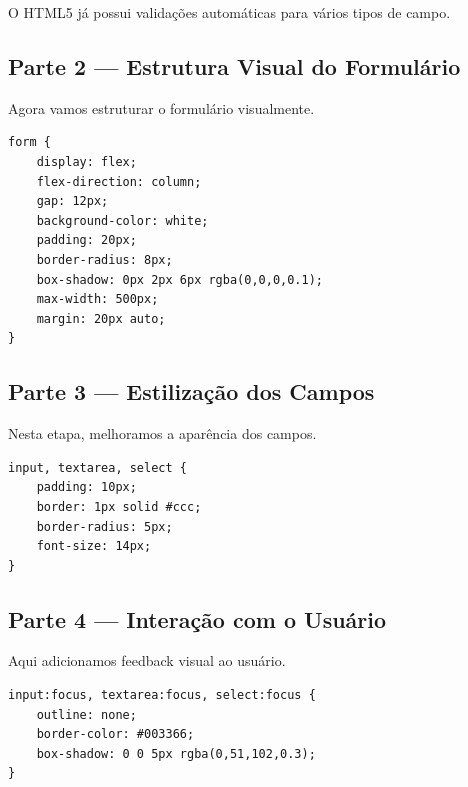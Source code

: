 \documentclass[12pt,a4paper]{article}
\begin{document}
\begin{boxDica}
O HTML5 já possui validações automáticas para vários tipos de campo.
\end{boxDica}


\subsection{Parte 2 — Estrutura Visual do Formulário}

Agora vamos estruturar o formulário visualmente.

\begin{boxCodigo}
\begin{verbatim}
form {
    display: flex;
    flex-direction: column;
    gap: 12px;
    background-color: white;
    padding: 20px;
    border-radius: 8px;
    box-shadow: 0px 2px 6px rgba(0,0,0,0.1);
    max-width: 500px;
    margin: 20px auto;
}
\end{verbatim}
\end{boxCodigo}

\subsection{Parte 3 — Estilização dos Campos}

Nesta etapa, melhoramos a aparência dos campos.

\begin{boxCodigo}
\begin{verbatim}
input, textarea, select {
    padding: 10px;
    border: 1px solid #ccc;
    border-radius: 5px;
    font-size: 14px;
}
\end{verbatim}
\end{boxCodigo}


\subsection{Parte 4 — Interação com o Usuário}

Aqui adicionamos feedback visual ao usuário.

\begin{boxCodigo}
\begin{verbatim}
input:focus, textarea:focus, select:focus {
    outline: none;
    border-color: #003366;
    box-shadow: 0 0 5px rgba(0,51,102,0.3);
}
\end{verbatim}
\end{boxCodigo}
\end{document}

